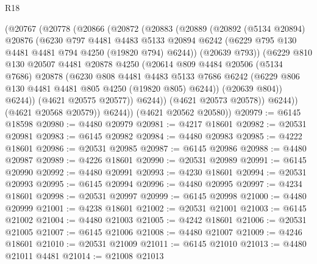 \begin{lexlean}{R18}
\begin{coremodule}
              (@20767
                (@20778
                  (@20866
                    (@20872
                      (@20883
                        (@20889
                          (@20892
                            (@5134 @20894)
                            @20876
                            (@6230
                              @797
                              @4481
                              @4483
                              @5133
                              @20894
                              @6242
                              (@6229 @795 @130 @4481 @4481 @794 @4250 (@19820 @794) @6244))
                            (@20639 @793))
                          (@6229
                            @810
                            @130
                            @20507
                            @4481
                            @20878
                            @4250
                            (@20614
                              @809
                              @4484
                              @20506
                              (@5134 @7686)
                              @20878
                              (@6230
                                @808
                                @4481
                                @4483
                                @5133
                                @7686
                                @6242
                                (@6229 @806 @130 @4481 @4481 @805 @4250 (@19820 @805) @6244))
                              (@20639 @804))
                            @6244))
                        (@4621 @20575 @20577))
                      @6244))
                  (@4621 @20573 @20578))
                @6244))
            (@4621 @20568 @20579))
          @6244))
      (@4621 @20562 @20580))
@20979 := @6145 @18598
@20980 := @4480 @20979
@20981 := @4217 @18601
@20982 := @20531 @20981
@20983 := @6145 @20982
@20984 := @4480 @20983
@20985 := @4222 @18601
@20986 := @20531 @20985
@20987 := @6145 @20986
@20988 := @4480 @20987
@20989 := @4226 @18601
@20990 := @20531 @20989
@20991 := @6145 @20990
@20992 := @4480 @20991
@20993 := @4230 @18601
@20994 := @20531 @20993
@20995 := @6145 @20994
@20996 := @4480 @20995
@20997 := @4234 @18601
@20998 := @20531 @20997
@20999 := @6145 @20998
@21000 := @4480 @20999
@21001 := @4238 @18601
@21002 := @20531 @21001
@21003 := @6145 @21002
@21004 := @4480 @21003
@21005 := @4242 @18601
@21006 := @20531 @21005
@21007 := @6145 @21006
@21008 := @4480 @21007
@21009 := @4246 @18601
@21010 := @20531 @21009
@21011 := @6145 @21010
@21013 := @4480 @21011 @4481
@21014 := @21008 @21013

\end{coremodule}
\end{lexlean}
